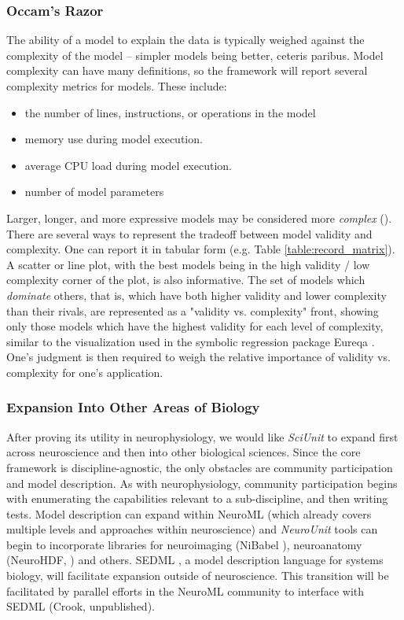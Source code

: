 \documentclass[11pt,letterpaper]{article}
\begin{document}
\subsubsection{Occam's Razor}
The ability of a model to explain the data is typically weighed against the complexity of the model -- simpler models being better, ceteris paribus.  Model complexity can have many definitions, so the framework will report several complexity metrics for models.  These include:
\begin{itemize}
\item the number of lines, instructions, or operations in the model
\item memory use during model execution.  
\item average CPU load during model execution.  
\item number of model parameters
\end{itemize}
Larger, longer, and more expressive models may be considered more \textit{complex} (\cite{mccabe_complexity_1976}).  There are several ways to represent the tradeoff between model validity and complexity.  One can report it in tabular form (e.g. Table \ref{table:record_matrix}).  A scatter or line plot, with the best models being in the high validity / low complexity corner of the plot, is also informative.  The set of models which \textit{dominate} others, that is, which have both higher validity and lower complexity than their rivals, are represented as a "validity vs. complexity" front, showing only those models which have the highest validity for each level of complexity, similar to the visualization used in the symbolic regression package Eureqa \cite{schmidt_distilling_2009}.  One's judgment is then required to weigh the relative importance of validity vs. complexity for one's application.  

\subsubsection{Expansion Into Other Areas of Biology}
After proving its utility in neurophysiology, we would like \textit{SciUnit} to expand first across neuroscience and then into other biological sciences.  Since the core framework is discipline-agnostic, the only obstacles are community participation and model description.  As with neurophysiology, community participation begins with enumerating the capabilities relevant to a sub-discipline, and then writing tests.  Model description can expand within NeuroML (which already covers multiple levels and approaches within neuroscience) and \textit{NeuroUnit} tools can begin to incorporate libraries for neuroimaging (NiBabel \cite{nibabel_url}), neuroanatomy (NeuroHDF, \cite{neurohdf_url}) and others.  SEDML \cite{hucka_systems_2003,sedml_url}, a model description language for systems biology, will facilitate expansion outside of neuroscience.  This transition will be facilitated by parallel efforts in the NeuroML community to interface with SEDML (Crook, unpublished).    
\end{document}
